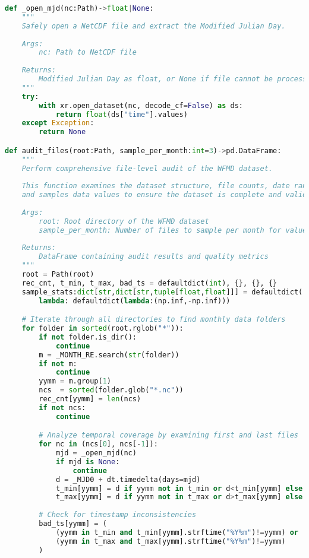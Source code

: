 \begin{lstlisting}[language=Python, caption=Dataset Health Check Algorithm, label=alg:step05_health_check, breaklines=true]
def _open_mjd(nc:Path)->float|None:
    """
    Safely open a NetCDF file and extract the Modified Julian Day.
    
    Args:
        nc: Path to NetCDF file
        
    Returns:
        Modified Julian Day as float, or None if file cannot be processed
    """
    try:
        with xr.open_dataset(nc, decode_cf=False) as ds:
            return float(ds["time"].values)
    except Exception:
        return None

def audit_files(root:Path, sample_per_month:int=3)->pd.DataFrame:
    """
    Perform comprehensive file-level audit of the WFMD dataset.
    
    This function examines the dataset structure, file counts, date ranges,
    and samples data values to ensure the dataset is complete and valid.
    
    Args:
        root: Root directory of the WFMD dataset
        sample_per_month: Number of files to sample per month for value ranges
        
    Returns:
        DataFrame containing audit results and quality metrics
    """
    root = Path(root)
    rec_cnt, t_min, t_max, bad_ts = defaultdict(int), {}, {}, {}
    sample_stats:dict[str,dict[str,tuple[float,float]]] = defaultdict(
        lambda: defaultdict(lambda:(np.inf,-np.inf)))

    # Iterate through all directories to find monthly data folders
    for folder in sorted(root.rglob("*")):
        if not folder.is_dir(): 
            continue
        m = _MONTH_RE.search(str(folder))
        if not m: 
            continue
        yymm = m.group(1)
        ncs  = sorted(folder.glob("*.nc"))
        rec_cnt[yymm] = len(ncs)
        if not ncs:
            continue

        # Analyze temporal coverage by examining first and last files
        for nc in (ncs[0], ncs[-1]):
            mjd = _open_mjd(nc)
            if mjd is None:
                continue
            d = _MJD0 + dt.timedelta(days=mjd)
            t_min[yymm] = d if yymm not in t_min or d<t_min[yymm] else t_min[yymm]
            t_max[yymm] = d if yymm not in t_max or d>t_max[yymm] else t_max[yymm]
        
        # Check for timestamp inconsistencies
        bad_ts[yymm] = (
            (yymm in t_min and t_min[yymm].strftime("%Y%m")!=yymm) or
            (yymm in t_max and t_max[yymm].strftime("%Y%m")!=yymm)
        )


\end{lstlisting}
